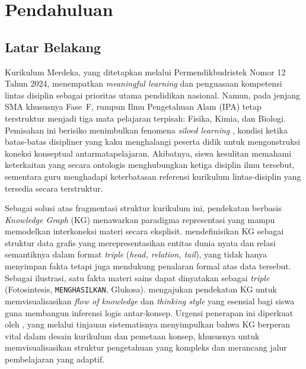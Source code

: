 \documentclass[main]{subfiles}
\begin{document}
\setcounter{chapter}{0}   %

\chapter{Pendahuluan}

\section{Latar Belakang}

Kurikulum Merdeka, yang ditetapkan melalui Permendikbudristek Nomor 12 Tahun
2024, menempatkan \textit{meaningful learning} dan penguasaan kompetensi lintas
disiplin sebagai prioritas utama pendidikan nasional. Namun, pada jenjang SMA
khususnya Fase~F, rumpun Ilmu Pengetahuan Alam (IPA) tetap terstruktur menjadi
tiga mata pelajaran terpisah: Fisika, Kimia, dan Biologi.
Pemisahan ini berisiko menimbulkan fenomena \textit{siloed learning}
\parencite{harvey_silos_2025}, kondisi ketika batas-batas disipliner yang kaku
menghalangi peserta didik untuk mengonstruksi koneksi konseptual
antarmatapelajaran. Akibatnya, siswa kesulitan memahami keterkaitan yang secara
ontologis menghubungkan ketiga disiplin ilmu tersebut, sementara guru menghadapi
keterbatasan referensi kurikulum lintas-disiplin yang tersedia secara terstruktur.

Sebagai solusi atas fragmentasi struktur kurikulum ini, pendekatan berbasis
\textit{Knowledge Graph} (KG) menawarkan paradigma representasi yang mampu
memodelkan interkoneksi materi secara eksplisit. \textcite{ji_survey_2022} mendefinisikan
KG sebagai struktur data grafis yang merepresentasikan entitas dunia nyata dan
relasi semantiknya dalam format \textit{triple} (\textit{head, relation, tail}),
yang tidak hanya menyimpan fakta tetapi juga mendukung penalaran formal atas
data tersebut. Sebagai ilustrasi, satu fakta materi sains dapat dinyatakan
sebagai \textit{triple} (Fotosintesis, \texttt{MENGHASILKAN}, Glukosa).
\textcite{kim_study_2023} mengajukan pendekatan KG untuk
memvisualisasikan \textit{flow of knowledge} dan \textit{thinking style} yang
esensial bagi siswa guna membangun inferensi logis antar-konsep. Urgensi
penerapan ini diperkuat oleh \textcite{abu-salih_systematic_2024}, yang melalui tinjauan
sistematisnya menyimpulkan bahwa KG berperan vital dalam desain kurikulum dan
pemetaan konsep, khususnya untuk memvisualisasikan struktur pengetahuan yang
kompleks dan merancang jalur pembelajaran yang adaptif.
\end{document}
